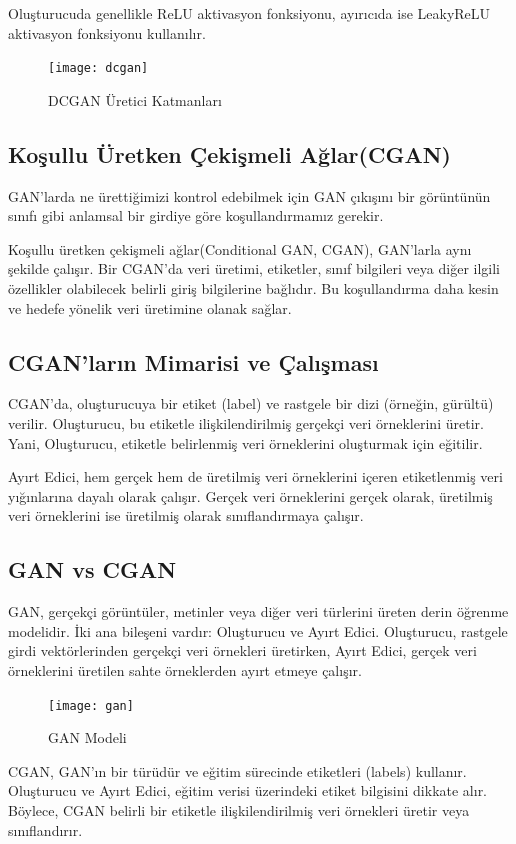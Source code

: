 \documentclass[12pt, a4paper]{article}
\begin{document}
	Oluşturucuda genellikle ReLU aktivasyon fonksiyonu, ayırıcıda ise LeakyReLU aktivasyon fonksiyonu kullanılır.
	
	\begin{figure}[h]
		\centering
		\texttt{[image: dcgan]}
		\label{dcgan}
		\caption{DCGAN Üretici Katmanları\cite{Train-2024-05-06}}
	\end{figure}
	\FloatBarrier
	\subsection{Koşullu Üretken Çekişmeli Ağlar(CGAN)}
	GAN'larda ne ürettiğimizi kontrol edebilmek için GAN çıkışını bir görüntünün sınıfı gibi anlamsal bir girdiye göre koşullandırmamız gerekir.
	
	Koşullu üretken çekişmeli ağlar(Conditional GAN, CGAN), GAN'larla aynı şekilde çalışır. Bir CGAN'da veri üretimi, etiketler, sınıf bilgileri veya diğer ilgili özellikler olabilecek belirli giriş bilgilerine bağlıdır. Bu koşullandırma daha kesin ve hedefe yönelik veri üretimine olanak sağlar\cite{Conditional-2024-05-06}.
	
	\subsection{CGAN'ların Mimarisi ve Çalışması}
	
	CGAN'da, oluşturucuya bir etiket (label) ve rastgele bir dizi (örneğin, gürültü) verilir. Oluşturucu, bu etiketle ilişkilendirilmiş gerçekçi veri örneklerini üretir. Yani, Oluşturucu, etiketle belirlenmiş veri örneklerini oluşturmak için eğitilir.
	
	Ayırt Edici, hem gerçek hem de üretilmiş veri örneklerini içeren etiketlenmiş veri yığınlarına dayalı olarak çalışır. Gerçek veri örneklerini gerçek olarak, üretilmiş veri örneklerini ise üretilmiş olarak sınıflandırmaya çalışır.
	
	\subsection{GAN vs CGAN}
	
	GAN, gerçekçi görüntüler, metinler veya diğer veri türlerini üreten derin öğrenme modelidir. İki ana bileşeni vardır: Oluşturucu ve Ayırt Edici. Oluşturucu, rastgele girdi vektörlerinden gerçekçi veri örnekleri üretirken, Ayırt Edici, gerçek veri örneklerini üretilen sahte örneklerden ayırt etmeye çalışır\cite{ConditionalGeeks-2024-05-06}.
	
	\begin{figure}[h]
		\centering
		\texttt{[image: gan]}
		\label{gan}
		\caption{GAN Modeli\cite{Train-2024-05-06}}
	\end{figure}
	\FloatBarrier
	CGAN, GAN'ın bir türüdür ve eğitim sürecinde etiketleri (labels) kullanır. Oluşturucu ve Ayırt Edici, eğitim verisi üzerindeki etiket bilgisini dikkate alır. Böylece, CGAN belirli bir etiketle ilişkilendirilmiş veri örnekleri üretir veya sınıflandırır\cite{ConditionalGeeks-2024-05-06}.
	
\end{document}
